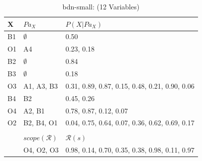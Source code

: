\documentclass{article}
\newcommand{\Pa}{\mathit{Pa}}
\begin{document}
		\begin{table}
			\centering
			\begin{tabular}{@{}lll@{}}
				X & $\Pa_X$ & $P(X | \Pa_X)$ \\
				\midrule
				B1 & $\emptyset$ & 0.50 \\
				O1 & A4 & 0.23, 0.18 \\
				B2 & $\emptyset$ & 0.84 \\
				B3 & $\emptyset$ & 0.18 \\
				O3 & A1, A3, B3 & 0.31, 0.89, 0.87, 0.15, 0.48, 0.21, 0.90, 0.06 \\
				B4 & B2 & 0.45, 0.26 \\
				O4 & A2, B1 & 0.78, 0.87, 0.12, 0.07 \\
				O2 & B2, B4, O1 & 0.04, 0.75, 0.64, 0.07, 0.36, 0.62, 0.69, 0.17 \\	
				\bottomrule
				\\
				& $scope(\mathcal{R})$ & $\mathcal{R}(s)$ \\
				\midrule
				&O4, O2, O3 & 0.98, 0.14, 0.70, 0.35, 0.38, 0.98, 0.11, 0.97
			\end{tabular}
			\caption{bdn-small: (12 Variables)}
			\label{table:small}
		\end{table}
		
\end{document}
